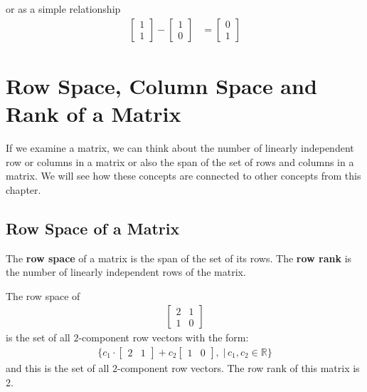 \begin{example}
or as a simple relationship
%
\begin{align*}
\begin{bmatrix}
1 \\ 1
\end{bmatrix} - \begin{bmatrix}
1 \\ 0 
\end{bmatrix} & = \begin{bmatrix}
0 \\ 1
\end{bmatrix}
\end{align*}
\end{example}


\vfill \pagebreak

\section{Row Space, Column Space and Rank of a Matrix}
\label{sect:row:col:space:rank}

If we examine a matrix, we can think about the number of linearly independent row or columns in a matrix or also the span of the set of rows and columns in a matrix.  We will see how these concepts are connected to other concepts from this chapter.  

\subsection{Row Space of a Matrix}

\begin{definition}
The \textbf{row space} of a matrix is the span of the set of its rows.  The \textbf{row rank} is the number of linearly independent rows of the matrix.  
\end{definition}


\begin{example}
The row space of 
%
\begin{align*}
\begin{bmatrix}
2 & 1 \\
1 & 0 
\end{bmatrix}
\end{align*}
is the set of all $2$-component row vectors with the form:
%
\begin{align*}
\{ c_1 \cdot \begin{bmatrix}
2 & 1 
\end{bmatrix} + c_2 \begin{bmatrix}
1 & 0 
\end{bmatrix}, \; | \, c_1, c_2 \in \mathbb{R} \}
\end{align*}
and this is the set of all $2$-component row vectors.   The row rank of this matrix is 2. 
\end{example}

